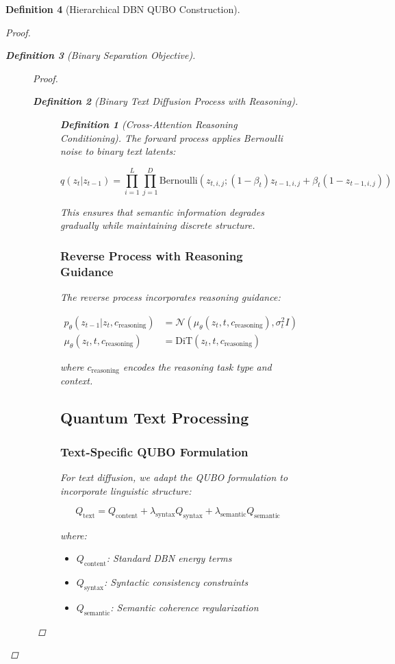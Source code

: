 \documentclass{article}
\newtheorem{definition}{Definition}
\begin{document}
\begin{definition}[Hierarchical DBN QUBO Construction]
\begin{proof}
\begin{definition}[Binary Separation Objective]
\begin{figure}[H]
\begin{proof}
\begin{definition}[Binary Text Diffusion Process with Reasoning]
\begin{figure}[H]
\begin{definition}[Cross-Attention Reasoning Conditioning]
The forward process applies Bernoulli noise to binary text latents:

\begin{equation}
q(z_t | z_{t-1}) = \prod_{i=1}^L \prod_{j=1}^D \text{Bernoulli}(z_{t,i,j}; (1-\beta_t) z_{t-1,i,j} + \beta_t(1-z_{t-1,i,j}))
\end{equation}

This ensures that semantic information degrades gradually while maintaining discrete structure.

\subsubsection{Reverse Process with Reasoning Guidance}

The reverse process incorporates reasoning guidance:

\begin{align}
p_\theta(z_{t-1} | z_t, c_{\text{reasoning}}) &= \mathcal{N}(\mu_\theta(z_t, t, c_{\text{reasoning}}), \sigma_t^2 I)\\
\mu_\theta(z_t, t, c_{\text{reasoning}}) &= \text{DiT}(z_t, t, c_{\text{reasoning}})
\end{align}

where $c_{\text{reasoning}}$ encodes the reasoning task type and context.

\subsection{Quantum Text Processing}

\subsubsection{Text-Specific QUBO Formulation}

For text diffusion, we adapt the QUBO formulation to incorporate linguistic structure:

\begin{equation}
Q_{\text{text}} = Q_{\text{content}} + \lambda_{\text{syntax}} Q_{\text{syntax}} + \lambda_{\text{semantic}} Q_{\text{semantic}}
\end{equation}

where:
\begin{itemize}
\item $Q_{\text{content}}$: Standard DBN energy terms
\item $Q_{\text{syntax}}$: Syntactic consistency constraints  
\item $Q_{\text{semantic}}$: Semantic coherence regularization
\end{itemize}


\end{definition}
\end{figure}
\end{definition}
\end{proof}
\end{figure}
\end{definition}
\end{proof}
\end{definition}
\end{document}
